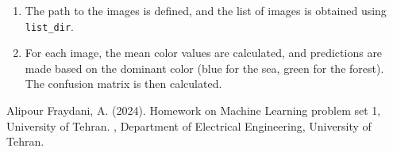 \documentclass[DIV=calc, paper=a4, fontsize=11pt, twocolumn]{scrartcl}	 %
\begin{document}
\begin{enumerate}
    \item The path to the images is defined, and the list of images is obtained using \texttt{list\_dir}.
    \item For each image, the mean color values are calculated, and predictions are made based on the dominant color (blue for the sea, green for the forest). The confusion matrix is then calculated.
\end{enumerate}


\begin{thebibliography}{99} %

  Alipour Fraydani, A. (2024).
  \newblock Homework on Machine Learning problem set 1, University of Tehran.
  , Department of Electrical Engineering, University of Tehran.
  
\end{thebibliography}

\end{document}
